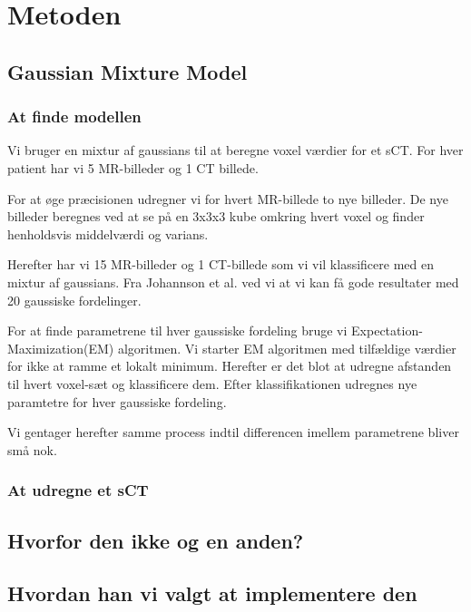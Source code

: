 \section{Metoden}
\subsection{Gaussian Mixture Model}

\subsubsection{At finde modellen}
Vi bruger en mixtur af gaussians til at beregne voxel værdier
for et sCT. For hver patient har vi 5 MR-billeder og 1 CT billede.

For at øge præcisionen udregner vi for hvert MR-billede
to nye billeder. De nye billeder beregnes ved at se på en 3x3x3
kube omkring hvert voxel og finder henholdsvis middelværdi og varians.

Herefter har vi 15 MR-billeder og 1 CT-billede som vi vil klassificere
med en mixtur af gaussians. Fra Johannson et al. ved vi at vi kan få
gode resultater med 20 gaussiske fordelinger.

For at finde parametrene til hver gaussiske fordeling bruge vi 
Expectation-Maximization(EM) algoritmen. Vi starter EM algoritmen med
tilfældige værdier for ikke at ramme et lokalt minimum. Herefter er
det blot at udregne afstanden til hvert voxel-sæt og klassificere dem.
Efter klassifikationen udregnes nye paramtetre for hver gaussiske
fordeling.

Vi gentager herefter samme process indtil differencen imellem parametrene
bliver små nok.


\subsubsection{At udregne et sCT}


\subsection{Hvorfor den ikke og en anden?}


\subsection{Hvordan han vi valgt at implementere den}

